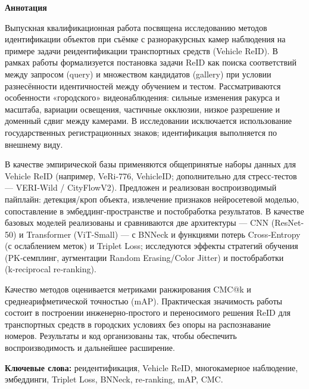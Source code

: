 \hspace{20pt}
\begin{center}
\textbf{{\huge{Аннотация}}}
\end{center}
\vspace{8pt}

Выпускная квалификационная работа посвящена исследованию методов идентификации объектов при съёмке с разноракурсных камер наблюдения на примере задачи реидентификации транспортных средств (Vehicle ReID). В рамках работы формализуется постановка задачи ReID как поиска соответствий между запросом (query) и множеством кандидатов (gallery) при условии разнесённости идентичностей между обучением и тестом. Рассматриваются особенности «городского» видеонаблюдения: сильные изменения ракурса и масштаба, вариации освещения, частичные окклюзии, низкое разрешение и доменный сдвиг между камерами. В исследовании исключается использование государственных регистрационных знаков; идентификация выполняется по внешнему виду.

В качестве эмпирической базы применяются общепринятые наборы данных для Vehicle ReID (например, VeRi-776, VehicleID; дополнительно для стресс‑тестов — VERI‑Wild / CityFlowV2). Предложен и реализован воспроизводимый пайплайн: детекция/кроп объекта, извлечение признаков нейросетевой моделью, сопоставление в эмбеддинг‑пространстве и постобработка результатов. В качестве базовых моделей реализованы и сравниваются две архитектуры — CNN (ResNet-50) и Transformer (ViT-Small) — с BNNeck и функциями потерь Cross‑Entropy (с ослаблением меток) и Triplet Loss; исследуются эффекты стратегий обучения (PK‑семплинг, аугментации Random Erasing/Color Jitter) и постобработки (k‑reciprocal re‑ranking).

Качество методов оценивается метриками ранжирования CMC@k и среднеарифметической точностью (mAP). Практическая значимость работы состоит в построении инженерно‑простого и переносимого решения ReID для транспортных средств в городских условиях без опоры на распознавание номеров. Результаты и код организованы так, чтобы обеспечить воспроизводимость и дальнейшее расширение.

\noindent\textbf{Ключевые слова:} реидентификация, Vehicle ReID, многокамерное наблюдение, эмбеддинги, Triplet Loss, BNNeck, re‑ranking, mAP, CMC.
